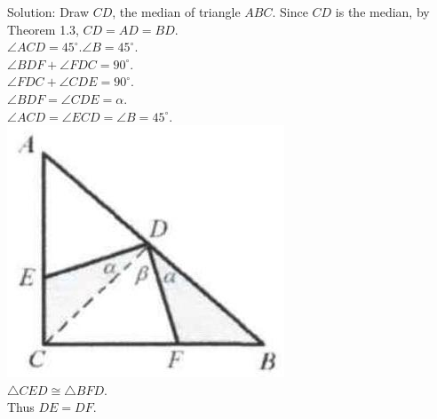 \documentclass{article}
\begin{document}
Solution:
Draw \(C D\), the median of triangle \(A B C\). Since \(C D\) is the median, by Theorem 1.3, \(C D=A D=B D\).\\
\(\angle A C D=45^{\circ} . \angle B=45^{\circ}\).\\
\(\angle B D F+\angle F D C=90^{\circ}\).\\
\(\angle F D C+\angle C D E=90^{\circ}\).\\
\(\angle B D F=\angle C D E=\alpha\).\\
\(\angle A C D=\angle E C D=\angle B=45^{\circ}\).\\
\centering
\includegraphics[width=\textwidth]{images/reasoning_image_1.jpg}\\
\(\triangle C E D \cong \triangle B F D\).\\
Thus \(D E=D F\).
\end{document}
